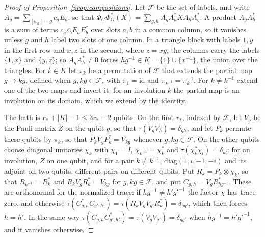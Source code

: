\begin{proof}[Proof of Proposition~\ref{prop:compositions}]
Let $\mathcal F$ be the set of labels, and write $A_g=\sum_{[w_a]=g}c_aE_a$, so that $\Phi_G\Phi_G^*(X)=\sum_{g,h}A_gA_h^*XA_hA_g^*$. A product $A_gA_h^*$
is a sum of terms $c_a\overline{c_b}E_aE_b^*$ over slots $a,b$ in a common column, so it vanishes unless $g$ and $h$ label two slots of one column. In a
triangle block with labels $1,y$ in the first row and $x,z$ in the second, where $z=xy$, the columns carry the labels $\{1,x\}$ and $\{y,z\}$; so
$A_gA_h^*\ne0$ forces $hg^{-1}\in K=\{1\}\cup\{x^{\pm1}\}$, the union over the triangles. For $k\in K$ let $\pi_k$ be a permutation of $\mathcal F$ that
extends the partial map $g\mapsto kg$, defined when $g,kg\in\mathcal F$, with $\pi_1=\mathrm{id}$ and $\pi_{k^{-1}}=\pi_k^{-1}$. For $k\ne k^{-1}$ extend
one of the two maps and invert it; for an involution $k$ the partial map is an involution on its domain, which we extend by the identity.

The bath is $r_*+|K|-1\le3r_*-2$ qubits. On the first $r_*$, indexed by $\mathcal F$, let $V_g$ be the Pauli matrix $Z$ on the qubit $g$, so that
$\tau(V_gV_h)=\delta_{gh}$, and let $P_k$ permute these qubits by $\pi_k$, so that $P_kV_gP_k^*=V_{kg}$ whenever $g,kg\in\mathcal F$. On the other
qubits choose diagonal unitaries $\chi_k$ with $\chi_1=I$, $\chi_{k^{-1}}=\chi_k^*$ and $\tau(\chi_k^*\chi_l)=\delta_{kl}$: for an involution, $Z$ on one
qubit, and for a pair $k\ne k^{-1}$, $\mathrm{diag}(1,i,-1,-i)$ and its adjoint on two qubits, different pairs on different qubits. Put
$R_k=P_k\otimes\chi_k$, so that $R_{k^{-1}}=R_k^*$ and $R_kV_gR_k^*=V_{kg}$ for $g,kg\in\mathcal F$, and put $C_{g,h}=V_gR_{hg^{-1}}^*$. These are
orthonormal for the normalized trace: if $hg^{-1}\ne h'g'^{-1}$ the factor $\chi$ has trace zero, and otherwise
$\tau(C_{g,h}^*C_{g',h'})=\tau(R_kV_gV_{g'}R_k^*)=\delta_{gg'}$, which then forces $h=h'$. In the same way
$\tau(C_{g,h}C_{g',h'}^*)=\tau(V_gV_{g'})=\delta_{gg'}$ when $hg^{-1}=h'g'^{-1}$, and it vanishes otherwise.


\end{proof}
